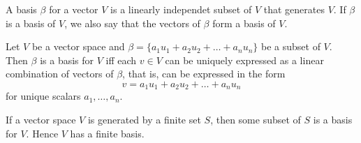 \documentclass[nobib,notoc]{tufte-handout}
\begin{document}
\begin{defi}[Basis]
	A basis \(\beta\) for a vector \(V\) is a linearly independet subset of \(V\) that generates \(V\). If \(\beta\) is a basis of \(V\), we also say that the vectors of \(\beta\) form a basis of \(V\).
\end{defi}
\begin{thm}
	Let \(V\) be a vector space and \(\beta=\{a_1u_1+a_2u_2+\ldots+a_nu_n\}\) be a subset of \(V\). Then \(\beta\) is a basis for \(V\) iff each \(v\in V\) can be uniquely expressed as a linear combination of vectors of \(\beta\), that is, can be expressed in the form
\begin{equation*}
	v=a_1u_1+a_2u_2+\ldots+a_nu_n
\end{equation*}
for unique scalars \(a_1,\ldots, a_n\).
\end{thm}
\begin{thm}
	If a vector space \(V\) is generated by a finite set \(S\), then some subset of \(S\) is a basis for \(V\). Hence \(V\) has a finite basis.
\end{thm}
\end{document}
